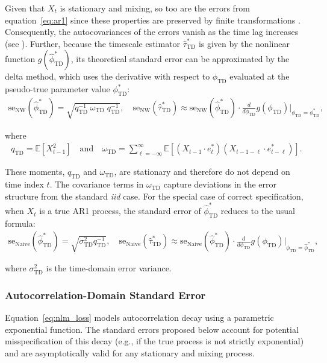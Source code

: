 \documentclass[9pt]{article}
\newcommand{\phitd}{\phi_{\scriptscriptstyle\text{TD}}}
\newcommand{\hatphitd}{\hat{\phi}^*_{\scriptscriptstyle\text{TD}}}
\newcommand{\hattautd}{\hat{\tau}^*_{\scriptscriptstyle\text{TD}}}
\newcommand{\qtd}{q_{\scriptscriptstyle\text{TD}}}
\newcommand{\omegatd}{\omega_{\scriptscriptstyle\text{TD}}}
\newcommand{\sigmatd}{\sigma_{\scriptscriptstyle\text{TD}}}
\begin{document}
Given that $X_t$ is stationary and mixing, so too are the errors from equation~\eqref{eq:ar1} since these properties are preserved by finite transformations \citep[Theorem~14.2 and Theorem~14.12]{hansen_econometrics_2022}. Consequently, the autocovariances of the errors vanish as the time lag increases (see ). Further, because the timescale estimator $\hattautd$ is given by the nonlinear function $g(\hatphitd)$, its theoretical standard error can be approximated by the delta method, which uses the derivative with respect to $\phitd$ evaluated at the pseudo-true parameter value $\phitd^*$:
\begin{align}
    \text{se}_{\text{NW}}(\hatphitd) = \sqrt{\qtd^{-1}\; \omegatd \; \qtd^{-1}} \label{eq:se-ar1-phi}, \quad
    \text{se}_{\text{NW}}(\hattautd) \approx \text{se}_{\text{NW}}(\hatphitd) \cdot \frac{d}{d\phitd} g(\phitd)\Big|_{\phitd=\phitd^*},
\end{align}

\noindent where
\begin{align}\label{eq:se-ar1-qomega}
    \qtd = \mathbb{E}[X_{t-1}^2] \quad\text{and}\quad \omegatd = \sum_{\ell=-\infty}^{\infty} \mathbb{E}[(X_{t-1} \cdot e_t^*)(X_{t-1-\ell} \cdot e_{t-\ell}^*)].
\end{align}

\noindent These moments, $\qtd$ and $\omegatd$, are stationary and therefore do not depend on time index $t$. The covariance terms in $\omegatd$ capture deviations in the error structure from the standard \textit{iid} case. For the special case of correct specification, when $X_t$ is a true AR1 process, the standard error of $\hatphitd$ reduces to the usual formula:
\begin{align}\label{eq:se-naive}
    \text{se}_{\text{Naive}}(\hatphitd) = \sqrt{\sigmatd^2 \qtd^{-1}}, \quad
    \text{se}_\text{Naive}(\hattautd) \approx \text{se}_{\text{Naive}}(\hatphitd) \cdot \frac{d}{d\phitd} g(\phitd)\Big|_{\phitd=\hatphitd},
\end{align}

\noindent where $\sigmatd^2$ is the time-domain error variance. \\

\subsubsection{Autocorrelation-Domain Standard Error}\label{sec:stderr-autocorrelation-domain}
Equation~\eqref{eq:nlm_loss} models autocorrelation decay using a parametric exponential function. The standard errors proposed below account for potential misspecification of this decay (e.g., if the true process is not strictly exponential) and are asymptotically valid for any stationary and mixing process.\\
\end{document}
